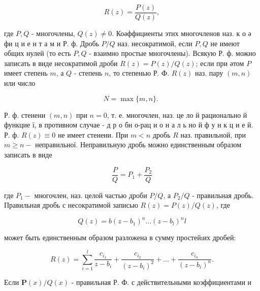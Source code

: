 \documentclass[10pt]{article}
\begin{document}
\[

R(z)=\frac{P(z)}{Q(z)},

\]



где $P, Q$ - многочлены, $Q(z) \neq 0$. Коәффициенты этих многочленов наз. к о ә фи ц и е н т а м и Р. ф. Дробь $P / Q$ наз. несократимой, если $P, Q$ не имеют общих нулей (то есть $P, Q$ - взаимно простые многочлены). Всякую Р. ф. можно записать в виде несократимой дроби $R(z)=P(z) / Q(z)$; если при әтом $P$ имеет степень $m$, а $Q$ - степень $n$, то степенью Р. Ф. $R(z)$ наз. пару $(m, n)$ или число



\[

N=\max \{m, n\} \text {. }

\]



Р. ф. стенени $(m, n)$ при $n=0$, т. е. многочлен, наз. це ло й рационально й функцие ї, в противном случае - д р о бн о-рац и о н а л ь но й $ф$ у н к ц и е й. Р. ф. $R(z) \equiv 0$ не имеет стенени. При $m<n$ дробь $R$ наз. правильной, при $m \geqslant n-$ неправильної. Неправильную дробь можно единственным образом записать в виде



\[

\frac{P}{Q}=P_{1}+\frac{P_{2}}{Q}

\]



где $P_{1}-$ многочлен, наз. целой частью дроби $P / Q$, а $P_{2} / Q$ - правильная дробь. Правильная дробь с несократимой записью $R(z)=P(z) / Q(z)$, где



\[

Q(z)=b\left(z-b_{1}\right)^{n} \ldots\left(z-b_{l}\right)^{n} l

\]



может быть единственным образом разложена в сумму простейıих дробей:



\[

R(z)=\sum_{i=1}^{l} \frac{c_{i_{1}}}{z-b_{i}}+\frac{c_{i_{2}}}{\left(z-b_{i}\right)^{2}}+\ldots+\frac{c_{i_{n}}}{\left(z-b_{i}\right)^{n}} .

\]



Если $\boldsymbol{P}(x) / Q(x)$ - правильная Р. Ф. с действительными коэффициентами и
\end{document}
